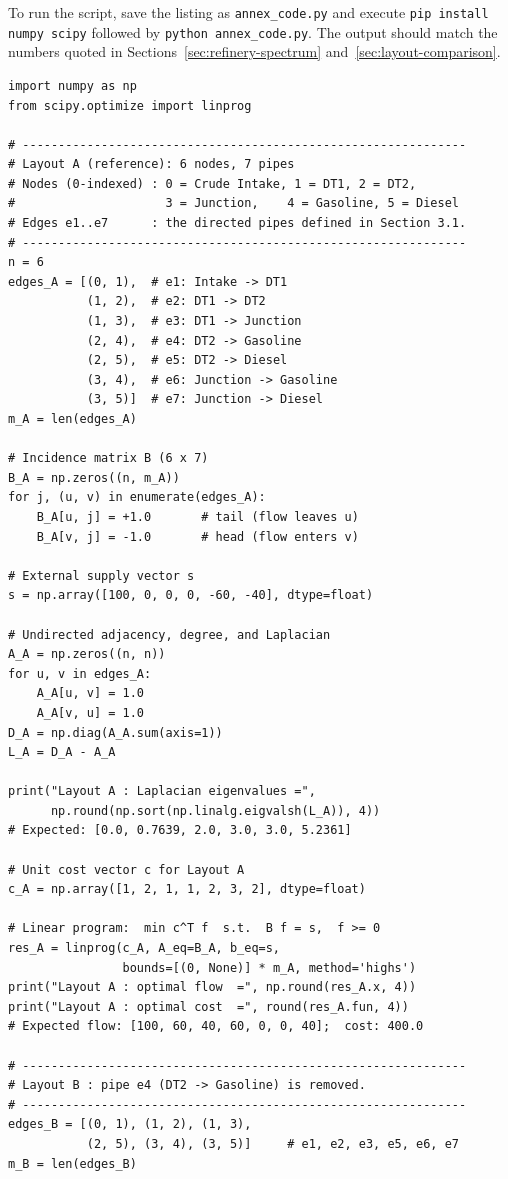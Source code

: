 \documentclass[11pt,a4paper]{article}
\begin{document}
To run the script, save the listing as \texttt{annex\_code.py} and
execute \texttt{pip install numpy scipy} followed by \texttt{python
annex\_code.py}. The output should match the numbers quoted in
Sections~\ref{sec:refinery-spectrum} and~\ref{sec:layout-comparison}.

\begin{verbatim}
import numpy as np
from scipy.optimize import linprog

# --------------------------------------------------------------
# Layout A (reference): 6 nodes, 7 pipes
# Nodes (0-indexed) : 0 = Crude Intake, 1 = DT1, 2 = DT2,
#                     3 = Junction,    4 = Gasoline, 5 = Diesel
# Edges e1..e7      : the directed pipes defined in Section 3.1.
# --------------------------------------------------------------
n = 6
edges_A = [(0, 1),  # e1: Intake -> DT1
           (1, 2),  # e2: DT1 -> DT2
           (1, 3),  # e3: DT1 -> Junction
           (2, 4),  # e4: DT2 -> Gasoline
           (2, 5),  # e5: DT2 -> Diesel
           (3, 4),  # e6: Junction -> Gasoline
           (3, 5)]  # e7: Junction -> Diesel
m_A = len(edges_A)

# Incidence matrix B (6 x 7)
B_A = np.zeros((n, m_A))
for j, (u, v) in enumerate(edges_A):
    B_A[u, j] = +1.0       # tail (flow leaves u)
    B_A[v, j] = -1.0       # head (flow enters v)

# External supply vector s
s = np.array([100, 0, 0, 0, -60, -40], dtype=float)

# Undirected adjacency, degree, and Laplacian
A_A = np.zeros((n, n))
for u, v in edges_A:
    A_A[u, v] = 1.0
    A_A[v, u] = 1.0
D_A = np.diag(A_A.sum(axis=1))
L_A = D_A - A_A

print("Layout A : Laplacian eigenvalues =",
      np.round(np.sort(np.linalg.eigvalsh(L_A)), 4))
# Expected: [0.0, 0.7639, 2.0, 3.0, 3.0, 5.2361]

# Unit cost vector c for Layout A
c_A = np.array([1, 2, 1, 1, 2, 3, 2], dtype=float)

# Linear program:  min c^T f  s.t.  B f = s,  f >= 0
res_A = linprog(c_A, A_eq=B_A, b_eq=s,
                bounds=[(0, None)] * m_A, method='highs')
print("Layout A : optimal flow  =", np.round(res_A.x, 4))
print("Layout A : optimal cost  =", round(res_A.fun, 4))
# Expected flow: [100, 60, 40, 60, 0, 0, 40];  cost: 400.0

# --------------------------------------------------------------
# Layout B : pipe e4 (DT2 -> Gasoline) is removed.
# --------------------------------------------------------------
edges_B = [(0, 1), (1, 2), (1, 3),
           (2, 5), (3, 4), (3, 5)]     # e1, e2, e3, e5, e6, e7
m_B = len(edges_B)


\end{verbatim}
\end{document}

